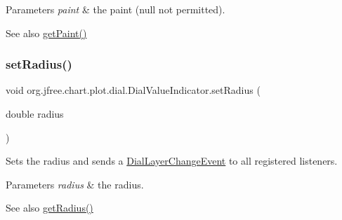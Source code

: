 \begin{DoxyParams}{Parameters}
{\em paint} & the paint ({\ttfamily null} not permitted).\\
\hline
\end{DoxyParams}
\begin{DoxySeeAlso}{See also}
\mbox{\hyperlink{classorg_1_1jfree_1_1chart_1_1plot_1_1dial_1_1_dial_value_indicator_a5786836e013fbace6842f0bd4f1947c0}{get\+Paint()}} 
\end{DoxySeeAlso}
\mbox{\label{classorg_1_1jfree_1_1chart_1_1plot_1_1dial_1_1_dial_value_indicator_a61cf04616e22afc08ab29777c4b8762c}} 
\subsubsection{\texorpdfstring{set\+Radius()}{setRadius()}}
{\footnotesize\ttfamily void org.\+jfree.\+chart.\+plot.\+dial.\+Dial\+Value\+Indicator.\+set\+Radius (\begin{DoxyParamCaption}\item[{double}]{radius }\end{DoxyParamCaption})}

Sets the radius and sends a \mbox{\hyperlink{classorg_1_1jfree_1_1chart_1_1plot_1_1dial_1_1_dial_layer_change_event}{Dial\+Layer\+Change\+Event}} to all registered listeners.


\begin{DoxyParams}{Parameters}
{\em radius} & the radius.\\
\hline
\end{DoxyParams}
\begin{DoxySeeAlso}{See also}
\mbox{\hyperlink{classorg_1_1jfree_1_1chart_1_1plot_1_1dial_1_1_dial_value_indicator_a00272dd6350f35bbbd29f744685cb692}{get\+Radius()}} 
\end{DoxySeeAlso}
\mbox{\label{classorg_1_1jfree_1_1chart_1_1plot_1_1dial_1_1_dial_value_indicator_a9b3ddc35fb5d1372514575daeac445ed}} 
